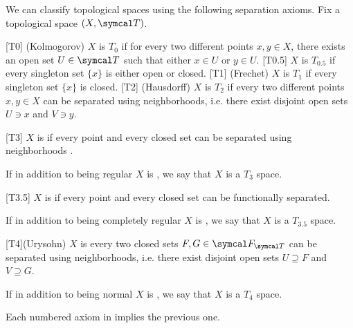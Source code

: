 \begin{definition}\label{def:separation_axioms}
  We can classify topological spaces using the following separation axioms. Fix a topological space \( (X, \Cal{T}) \).

  \begin{description}
    [T0] (Kolmogorov) \( X \) is \( T_0 \) if for every two different points \( x, y \in X \), there exists an open set \( U \in \Cal{T} \) such that either \( x \in U \) or \( y \in U \).
    [T0.5] \( X \) is \( T_{0.5} \) if every singleton set \( \{ x \} \) is either open or closed.
    [T1] (Frechet) \( X \) is \( T_1 \) if every singleton set \( \{ x \} \) is closed.
    [T2] (Hausdorff) \( X \) is \( T_2 \) if every two different points \( x, y \in X \) can be separated using neighborhoods, i.e. there exist disjoint open sets \( U \ni x \) and \( V \ni y \).

    [T3] \( X \) is  if every point and every closed set can be separated using neighborhoods .

    If in addition to being regular \( X \) is , we say that \( X \) is a \( T_3 \) space.

    [T3.5] \( X \) is  if every point and every closed set can be functionally separated.

    If in addition to being completely regular \( X \) is , we say that \( X \) is a \( T_{3.5} \) space.

    [T4](Urysohn) \( X \) is  every two closed sets \( F, G \in \Cal{F}_{\Cal{T}} \) can be separated using neighborhoods, i.e. there exist disjoint open sets \( U \supseteq F \) and \( V \supseteq G \).

    If in addition to being normal \( X \) is , we say that \( X \) is a \( T_4 \) space.
  \end{description}
\end{definition}

\begin{proposition}\label{thm:separation_axioms_cascade}
  Each numbered axiom in  implies the previous one.
\end{proposition}

